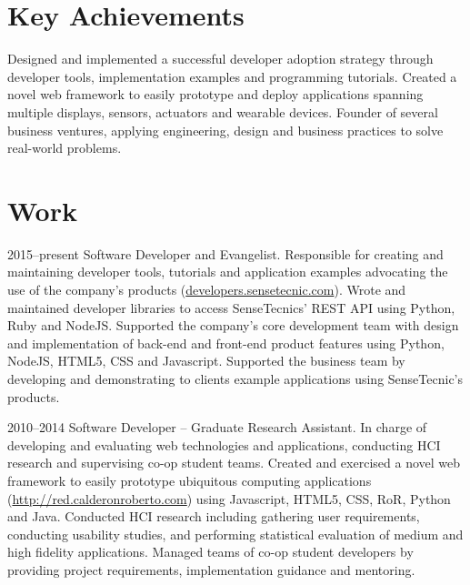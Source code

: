 \documentclass[full]{rvca}
\begin{document}
\section{Key Achievements}

\achievements
{Designed and implemented a successful developer adoption strategy through developer tools, implementation examples and programming tutorials.} 
{Created a novel web framework to easily prototype and deploy applications spanning multiple displays, sensors, actuators and wearable devices.}
{Founder of several business ventures, applying engineering, design and business practices to solve real-world problems.}
{}

\section{Work}


{2015--present}%
{Software Developer and Evangelist.} %
{Responsible for creating and maintaining developer tools, tutorials and application examples advocating the use of the company's products (\href{http://developers.sensetecnic.com}{developers.sensetecnic.com}).}%
{Wrote and maintained developer libraries to access SenseTecnics' REST API using Python, Ruby and NodeJS.}
{Supported the company's core development team with design and implementation of back-end and front-end product features using Python, NodeJS, HTML5, CSS and Javascript.}
{Supported the business team by developing and demonstrating to clients example applications using SenseTecnic's products.}
{}
{}

{2010--2014}%
{Software Developer -- Graduate Research Assistant.} %
{In charge of developing and evaluating web technologies and applications, conducting HCI research and supervising co-op student teams.} %
{Created and exercised a novel web framework to easily prototype ubiquitous computing applications (\href{http://red.calderonroberto.com}{http://red.calderonroberto.com}) using Javascript, HTML5, CSS, RoR, Python and Java.}
{Conducted HCI research including gathering user requirements, conducting usability studies, and performing statistical evaluation of medium and high fidelity applications.}
{Managed teams of co-op student developers by providing project requirements, implementation guidance and mentoring.}
{}
{}
\end{document}

